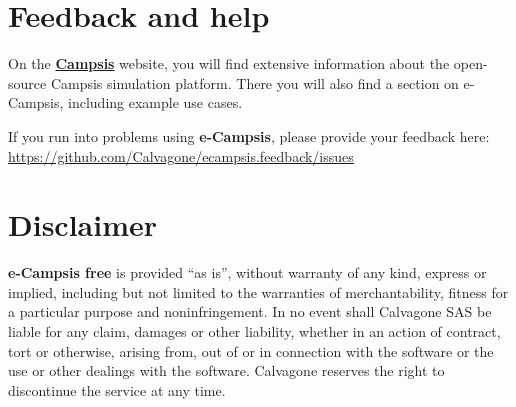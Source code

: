 \documentclass[
]{book}
\begin{document}
\hypertarget{feedback-and-help}{%
\chapter{Feedback and help}\label{feedback-and-help}}

On the \href{https://calvagone.github.io/}{\textbf{Campsis}} website, you will find extensive information about the open-source Campsis simulation platform. There you will also find a section on e-Campsis, including example use cases.

If you run into problems using \textbf{e-Campsis}, please provide your feedback here: \url{https://github.com/Calvagone/ecampsis.feedback/issues}

\hypertarget{disclaimer}{%
\chapter{Disclaimer}\label{disclaimer}}

\textbf{e-Campsis free} is provided ``as is'', without warranty of any kind, express or implied, including but not limited to the warranties of merchantability, fitness for a particular purpose and noninfringement. In no event shall Calvagone SAS be liable for any claim, damages or other liability, whether in an action of contract, tort or otherwise, arising from, out of or in connection with the software or the use or other dealings with the software. Calvagone reserves the right to discontinue the service at any time.
\end{document}
